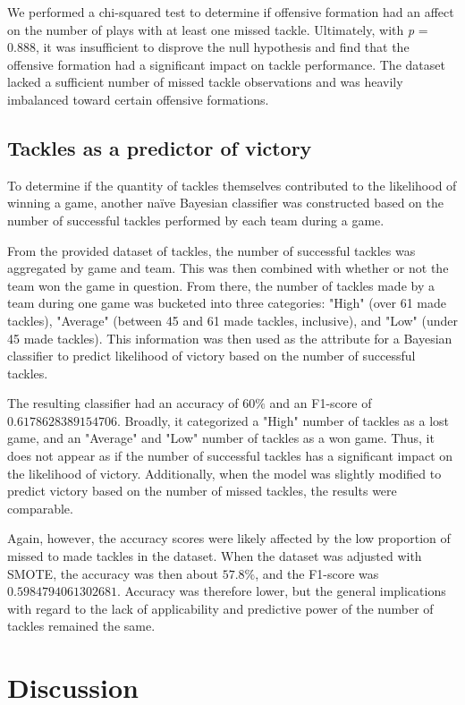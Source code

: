 \documentclass[bibtex, sigconf, hyperref={colorlinks=true,linkcolor=blue,urlcolor=blue}]{acmart}
\begin{document}
We performed a chi-squared test to determine if offensive formation had an
affect on the number of plays with at least one missed tackle. Ultimately, with
\textit{p} = 0.888, it was insufficient to disprove the null hypothesis and find
that the offensive formation had a significant impact on tackle performance. The
dataset lacked a sufficient number of missed tackle observations and was heavily
imbalanced toward certain offensive formations.

\subsection{Tackles as a predictor of victory}

To determine if the quantity of tackles themselves contributed to the
likelihood of winning a game, another na\"ive Bayesian classifier was
constructed based on the number of successful tackles performed by each team
during a game.

From the provided dataset of tackles, the number of successful tackles was
aggregated by game and team. This was then combined with whether or not the
team won the game in question. From there, the number of tackles made by a team
during one game was bucketed into three categories: "High" (over 61 made
tackles), "Average" (between 45 and 61 made tackles, inclusive), and "Low"
(under 45 made tackles). This information was then used as the attribute for a
Bayesian classifier to predict likelihood of victory based on the number of
successful tackles.

The resulting classifier had an accuracy of $60\%$ and an F1-score of
$0.6178628389154706$. Broadly, it categorized a "High" number of tackles as a
lost game, and an "Average" and "Low" number of tackles as a won game. Thus, it
does not appear as if the number of successful tackles has a significant impact
on the likelihood of victory. Additionally, when the model was slightly
modified to predict victory based on the number of missed tackles, the results
were comparable.

Again, however, the accuracy scores were likely affected by the low proportion
of missed to made tackles in the dataset. When the dataset was adjusted with
SMOTE, the accuracy was then about $57.8\%$, and the F1-score was
$0.5984794061302681$. Accuracy was therefore lower, but the general
implications with regard to the lack of applicability and predictive power of
the number of tackles remained the same.

\section{Discussion}
\end{document}

